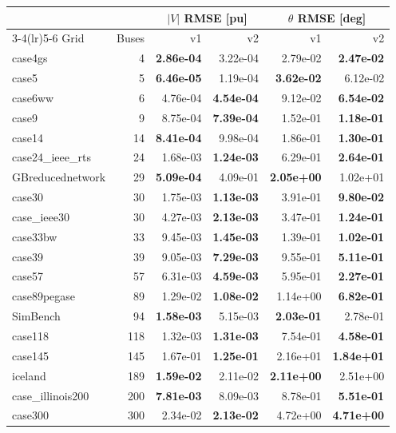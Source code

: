 \documentclass[10pt]{article}
\begin{document}
\begin{table}[H]
\centering\small
\begin{tabular}{lr rr rr}
\toprule
 & & \multicolumn{2}{c}{$|V|$ RMSE [pu]} & \multicolumn{2}{c}{$\theta$ RMSE [deg]} \\
\cmidrule(lr){3-4}\cmidrule(lr){5-6}
Grid & Buses & v1 & v2 & v1 & v2 \\
\midrule
case4gs & 4 & \textbf{2.86e-04} & 3.22e-04 & 2.79e-02 & \textbf{2.47e-02} \\
case5 & 5 & \textbf{6.46e-05} & 1.19e-04 & \textbf{3.62e-02} & 6.12e-02 \\
case6ww & 6 & 4.76e-04 & \textbf{4.54e-04} & 9.12e-02 & \textbf{6.54e-02} \\
case9 & 9 & 8.75e-04 & \textbf{7.39e-04} & 1.52e-01 & \textbf{1.18e-01} \\
case14 & 14 & \textbf{8.41e-04} & 9.98e-04 & 1.86e-01 & \textbf{1.30e-01} \\
case24\_ieee\_rts & 24 & 1.68e-03 & \textbf{1.24e-03} & 6.29e-01 & \textbf{2.64e-01} \\
GBreducednetwork & 29 & \textbf{5.09e-04} & 4.09e-01 & \textbf{2.05e+00} & 1.02e+01 \\
case30 & 30 & 1.75e-03 & \textbf{1.13e-03} & 3.91e-01 & \textbf{9.80e-02} \\
case\_ieee30 & 30 & 4.27e-03 & \textbf{2.13e-03} & 3.47e-01 & \textbf{1.24e-01} \\
case33bw & 33 & 9.45e-03 & \textbf{1.45e-03} & 1.39e-01 & \textbf{1.02e-01} \\
case39 & 39 & 9.05e-03 & \textbf{7.29e-03} & 9.55e-01 & \textbf{5.11e-01} \\
case57 & 57 & 6.31e-03 & \textbf{4.59e-03} & 5.95e-01 & \textbf{2.27e-01} \\
case89pegase & 89 & 1.29e-02 & \textbf{1.08e-02} & 1.14e+00 & \textbf{6.82e-01} \\
SimBench & 94 & \textbf{1.58e-03} & 5.15e-03 & \textbf{2.03e-01} & 2.78e-01 \\
case118 & 118 & 1.32e-03 & \textbf{1.31e-03} & 7.54e-01 & \textbf{4.58e-01} \\
case145 & 145 & 1.67e-01 & \textbf{1.25e-01} & 2.16e+01 & \textbf{1.84e+01} \\
iceland & 189 & \textbf{1.59e-02} & 2.11e-02 & \textbf{2.11e+00} & 2.51e+00 \\
case\_illinois200 & 200 & \textbf{7.81e-03} & 8.09e-03 & 8.78e-01 & \textbf{5.51e-01} \\
case300 & 300 & 2.34e-02 & \textbf{2.13e-02} & 4.72e+00 & \textbf{4.71e+00} \\

\end{tabular}
\end{table}
\end{document}
